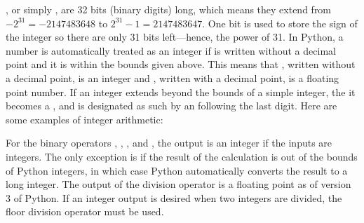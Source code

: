 \documentclass[letterpaper,10pt,english]{sphinxmanual}
\begin{document}
\sphinxAtStartPar
{}, or simply , are 32 bits (binary digits) long, which means they extend from \(-2^{31}=-2147483648\) to \(2^{31}-1=2147483647\). One bit is used to store the sign of the integer so there are only 31 bits left—hence, the power of 31.  In Python, a number is automatically treated as an integer if is written without a decimal point and  it is within the bounds given above.  This means that , written without a  decimal point, is an integer and , written with a decimal point, is a floating point number.  If an integer extends beyond the bounds of a simple integer, the it becomes a , and is designated as such by an  following the last digit.  Here are some examples of integer arithmetic:

\begin{sphinxVerbatim}[commandchars=\\\{\},numbers=left,firstnumber=1,stepnumber=1]




    
    
\end{sphinxVerbatim}

\sphinxAtStartPar
For the binary operators \sphinxcode{\sphinxupquote{+}}, \sphinxcode{\sphinxupquote{\sphinxhyphen{}}}, \sphinxcode{\sphinxupquote{*}}, and \sphinxcode{\sphinxupquote{//}}, the output is an integer if the inputs are integers.  The only exception is if the result of the calculation is out of the bounds of Python integers, in which case Python automatically converts the result to a long integer.  The output of the division operator \sphinxcode{\sphinxupquote{/}} is a floating point as of version 3 of Python.  If an integer output is desired when two integers are divided, the floor division operator \sphinxcode{\sphinxupquote{//}} must be used.
\end{document}
